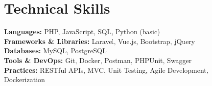 \documentclass[10.5pt,letterpaper]{article}
\begin{document}
	\section*{Technical Skills}
	\textbf{Languages:} PHP, JavaScript, SQL, Python (basic)\\
	\textbf{Frameworks \& Libraries:} Laravel, Vue.js, Bootstrap, jQuery\\
	\textbf{Databases:} MySQL, PostgreSQL\\
	\textbf{Tools \& DevOps:} Git, Docker, Postman, PHPUnit, Swagger\\
	\textbf{Practices:} RESTful APIs, MVC, Unit Testing, Agile Development, Dockerization
	
\end{document}
